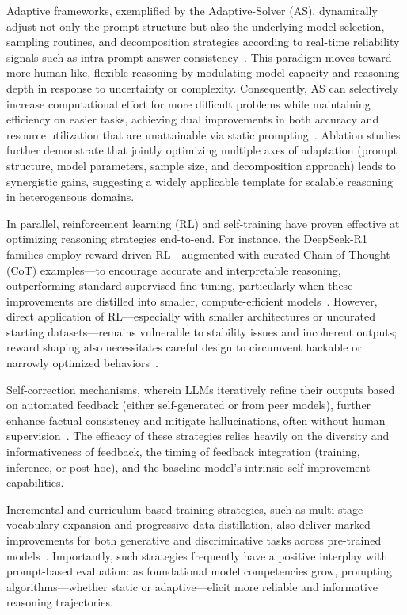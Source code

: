 \documentclass[sigconf]{acmart}
\begin{document}
Adaptive frameworks, exemplified by the Adaptive-Solver (AS), dynamically adjust not only the prompt structure but also the underlying model selection, sampling routines, and decomposition strategies according to real-time reliability signals such as intra-prompt answer consistency~\cite{ref4,ref57}. This paradigm moves toward more human-like, flexible reasoning by modulating model capacity and reasoning depth in response to uncertainty or complexity. Consequently, AS can selectively increase computational effort for more difficult problems while maintaining efficiency on easier tasks, achieving dual improvements in both accuracy and resource utilization that are unattainable via static prompting~\cite{ref4,ref57}. Ablation studies further demonstrate that jointly optimizing multiple axes of adaptation (prompt structure, model parameters, sample size, and decomposition approach) leads to synergistic gains, suggesting a widely applicable template for scalable reasoning in heterogeneous domains.

In parallel, reinforcement learning (RL) and self-training have proven effective at optimizing reasoning strategies end-to-end. For instance, the DeepSeek-R1 families employ reward-driven RL---augmented with curated Chain-of-Thought (CoT) examples---to encourage accurate and interpretable reasoning, outperforming standard supervised fine-tuning, particularly when these improvements are distilled into smaller, compute-efficient models~\cite{ref56,ref57,ref103}. However, direct application of RL---especially with smaller architectures or uncurated starting datasets---remains vulnerable to stability issues and incoherent outputs; reward shaping also necessitates careful design to circumvent hackable or narrowly optimized behaviors~\cite{ref56,ref57}.

Self-correction mechanisms, wherein LLMs iteratively refine their outputs based on automated feedback (either self-generated or from peer models), further enhance factual consistency and mitigate hallucinations, often without human supervision~\cite{ref68}. The efficacy of these strategies relies heavily on the diversity and informativeness of feedback, the timing of feedback integration (training, inference, or post hoc), and the baseline model's intrinsic self-improvement capabilities.

Incremental and curriculum-based training strategies, such as multi-stage vocabulary expansion and progressive data distillation, also deliver marked improvements for both generative and discriminative tasks across pre-trained models~\cite{ref49,ref103}. Importantly, such strategies frequently have a positive interplay with prompt-based evaluation: as foundational model competencies grow, prompting algorithms---whether static or adaptive---elicit more reliable and informative reasoning trajectories.
\end{document}
